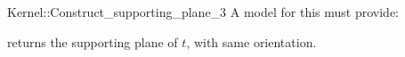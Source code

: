 \begin{ccRefFunctionObjectConcept}{Kernel::Construct_supporting_plane_3}
A model for this must provide:


       {returns the supporting plane of $t$, with same orientation.}

\end{ccRefFunctionObjectConcept}
